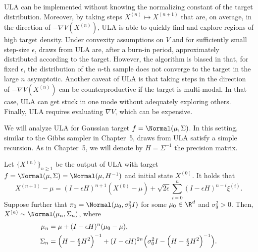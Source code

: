 \begin{remark}
ULA can be implemented without knowing the normalizing constant of the target distribution.
Moreover, by taking steps $X^{(n)} \mapsto X^{(n+1)}$ that are, on average, in the direction
of $-\nabla V(X^{(n)})$, ULA is able to quickly find and explore regions of high target density.
Under convexity assumptions on $V$ and for sufficiently small step-size $\epsilon$, draws from
ULA are, after a burn-in period, approximately distributed according to the target.
However, the algorithm is biased in that, for fixed $\epsilon$, the distribution of the $n$-th
sample does not converge to the target in the large $n$ asymptotic.
Another caveat of ULA is that taking steps in the direction of $-\nabla V(X^{(n)})$ can be
counterproductive if the target is multi-modal. In that case, ULA can get stuck in one mode
without adequately exploring others. Finally, ULA requires evaluating $\nabla V$, which can
be expensive.
\end{remark}

We will analyze ULA for Gaussian target $f = \Normal(\mu, \Sigma)$. In this setting, similar
to the Gibbs sampler in Chapter~5, draws from ULA satisfy a simple recursion. As in Chapter~5,
we will denote by $H = \Sigma^{-1}$ the precision matrix.

\begin{lemma}
\label{lem:6.1}
Let $\{X^{(n)}\}_{n \ge 1}$ be the output of ULA with target $f = \Normal(\mu, \Sigma) =
\Normal(\mu, H^{-1})$ and initial state $X^{(0)}$. It holds that
\begin{equation}
  \label{eq:6.2}
  X^{(n+1)} - \mu = (I - \epsilon H)^{n+1}(X^{(0)} - \mu)
  + \sqrt{2\epsilon}\sum_{i=0}^{n}(I - \epsilon H)^{n-i}\xi^{(i)}.
\end{equation}
Suppose further that $\pi_0 = \Normal(\mu_0, \sigma_0^2 I)$ for some $\mu_0 \in \R^d$ and
$\sigma_0^2 > 0$. Then, $X^{(n)} \sim \Normal(\mu_n, \Sigma_n)$, where
\begin{align}
  \mu_n &= \mu + (I - \epsilon H)^n(\mu_0 - \mu), \label{eq:6.3} \\
  \Sigma_n &= \Bigl(H - \tfrac{\epsilon}{2}H^2\Bigr)^{-1}
    + (I - \epsilon H)^{2n}\Bigl(\sigma_0^2 I - \Bigl(H - \tfrac{\epsilon}{2}H^2\Bigr)^{-1}\Bigr).
    \label{eq:6.4}
\end{align}
\end{lemma}

